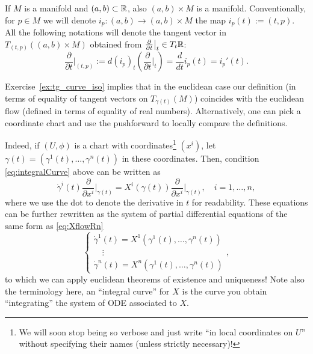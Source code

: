 \begin{notation}
  If $M$ is a manifold and $(a,b)\subset\mathbb{R}$, also $(a,b)\times M$ is a manifold. 
  Conventionally, for $p\in M$ we will denote $i_p : (a,b) \to (a,b)\times M$ the map $i_p(t) := (t,p)$.
  All the following notations will denote the tangent vector in $T_{(t,p)}((a,b)\times M)$ obtained from $\frac{\partial}{\partial t}\big|_t \in T_t\mathbb{R}$:
  \begin{equation}
    \frac{\partial}{\partial t}\Big|_{(t,p)} := d (i_p)_t\left(\frac{\partial}{\partial t}\Big|_t\right) = \frac{d}{d t}  i_p(t) = i_p'(t).
  \end{equation}
\end{notation}

Exercise~\ref{ex:tg_curve_iso} implies that in the euclidean case our definition (in terms of equality of tangent vectors on $T_{\gamma(t)}(M)$) coincides with the euclidean flow (defined in terms of equality of real numbers).
Alternatively, one can pick a coordinate chart and use the pushforward to locally compare the definitions.

Indeed, if $(U, \phi)$ is a chart with coordinates\footnote{We will soon stop being so verbose and just write ``in local coordinates on $U$'' without specifying their names (unless strictly necessary)!} $(x^i)$, let $\gamma(t) = (\gamma^1(t), \ldots, \gamma^n(t))$ in these coordinates. Then, condition \eqref{eq:integralCurve} above can be written as
\begin{equation}
  \dot\gamma^i(t)\frac{\partial}{\partial x^i}\Big|_{\gamma(t)}
  = X^i(\gamma(t))\frac{\partial}{\partial x^i}\Big|_{\gamma(t)},\quad i=1,\ldots,n,
\end{equation}
where we use the dot to denote the derivative in $t$ for readability.
These equations can be further rewritten as the system of partial differential equations of the same form as \eqref{eq:XflowRn}
\begin{equation}
  \begin{cases}
    \dot\gamma^1(t) = X^1(\gamma^1(t), \ldots, \gamma^n(t)) \\
    \quad \vdots \\
    \dot\gamma^n(t) = X^n(\gamma^1(t), \ldots, \gamma^n(t))
  \end{cases},
\end{equation}
to which we can apply euclidean theorems of existence and uniqueness!
Note also the terminology here, an ``integral curve'' for $X$ is the curve you obtain ``integrating'' the system of ODE associated to $X$.

